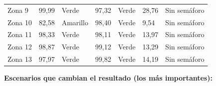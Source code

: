 \documentclass[11pt,letterpaper]{article}
\begin{document}
{\begin{xltabular}{\linewidth}{L{2.22cm}L{2.59cm}L{2.41cm}L{1.16cm}L{2.41cm}L{1.86cm}L{2.41cm}}
Zona 9 & 99,99 & Verde & 97,32 & Verde & 28,76 & Sin semáforo \\
Zona 10 & 82,58 & Amarillo & 98,40 & Verde & 9,54 & Sin semáforo \\
Zona 11 & 98,33 & Verde & 98,11 & Verde & 13,97 & Sin semáforo \\
Zona 12 & 98,87 & Verde & 99,12 & Verde & 13,29 & Sin semáforo \\
Zona 13 & 97,97 & Verde & 99,82 & Verde & 14,19 & Sin semáforo \\
\end{xltabular}
}


\textbf{Escenarios que cambian el resultado (los más importantes):}
\end{document}
